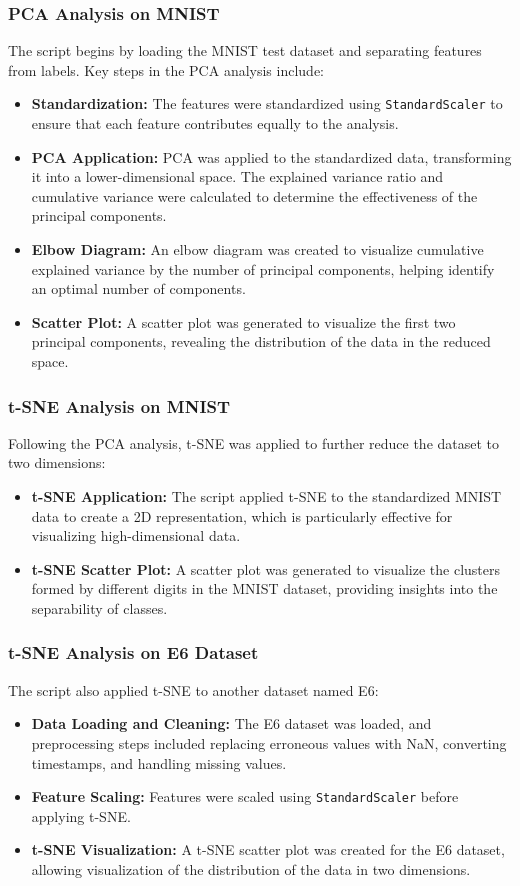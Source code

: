 \documentclass{article}
\begin{document}
\subsubsection{PCA Analysis on MNIST}
The script begins by loading the MNIST test dataset and separating features from labels. Key steps in the PCA analysis include:
\begin{itemize}
    \item \textbf{Standardization:} The features were standardized using \texttt{StandardScaler} to ensure that each feature contributes equally to the analysis.
    \item \textbf{PCA Application:} PCA was applied to the standardized data, transforming it into a lower-dimensional space. The explained variance ratio and cumulative variance were calculated to determine the effectiveness of the principal components.
    \item \textbf{Elbow Diagram:} An elbow diagram was created to visualize cumulative explained variance by the number of principal components, helping identify an optimal number of components.
    \item \textbf{Scatter Plot:} A scatter plot was generated to visualize the first two principal components, revealing the distribution of the data in the reduced space.
\end{itemize}

\subsubsection{t-SNE Analysis on MNIST}
Following the PCA analysis, t-SNE was applied to further reduce the dataset to two dimensions:
\begin{itemize}
    \item \textbf{t-SNE Application:} The script applied t-SNE to the standardized MNIST data to create a 2D representation, which is particularly effective for visualizing high-dimensional data.
    \item \textbf{t-SNE Scatter Plot:} A scatter plot was generated to visualize the clusters formed by different digits in the MNIST dataset, providing insights into the separability of classes.
\end{itemize}

\subsubsection{t-SNE Analysis on E6 Dataset}
The script also applied t-SNE to another dataset named E6:
\begin{itemize}
    \item \textbf{Data Loading and Cleaning:} The E6 dataset was loaded, and preprocessing steps included replacing erroneous values with NaN, converting timestamps, and handling missing values.
    \item \textbf{Feature Scaling:} Features were scaled using \texttt{StandardScaler} before applying t-SNE.
    \item \textbf{t-SNE Visualization:} A t-SNE scatter plot was created for the E6 dataset, allowing visualization of the distribution of the data in two dimensions.
\end{itemize}
\end{document}
